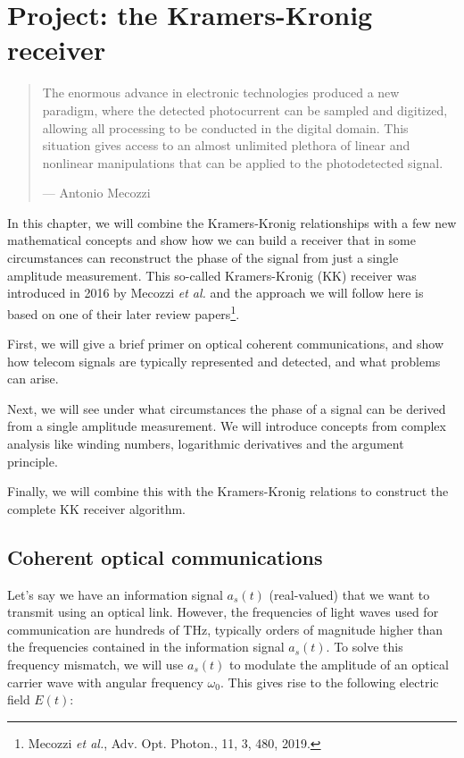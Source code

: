 \chapter{Project: the Kramers-Kronig receiver}
\label{h:kk-receiver}

\begin{quote}
The enormous advance in electronic technologies produced a new paradigm, where the detected photocurrent can be sampled and digitized, allowing all processing to be conducted in the digital domain. This situation gives access to an almost unlimited plethora of linear and nonlinear manipulations that can be applied to the photodetected signal.

--- Antonio Mecozzi
\end{quote}


\chaptertoc

In this chapter, we will combine the Kramers-Kronig relationships with a few new mathematical concepts and show how we can build a receiver that in some circumstances can reconstruct the phase of the signal from just a single amplitude measurement. This so-called Kramers-Kronig (KK) receiver was introduced in 2016 by Mecozzi \emph{et al.} and the approach we will follow here is based on one of their later review papers\footnote{Mecozzi \emph{et al.}, Adv. Opt. Photon., 11, 3, 480, 2019.}.

First, we will give a brief primer on optical coherent communications, and show how telecom signals are typically represented and detected, and what problems can arise.

Next, we will see under what circumstances the phase of a signal can be derived from a single amplitude measurement. We will introduce concepts from complex analysis like winding numbers, logarithmic derivatives and the argument principle.

Finally, we will combine this with the Kramers-Kronig relations to construct the complete KK receiver algorithm.

\pagebreak

\section{Coherent optical communications}

Let's say we have an information signal $a_s(t)$ (real-valued) that we want to transmit using an optical link. However, the frequencies of light waves used for communication are hundreds of THz, typically orders of magnitude higher than the frequencies contained in the information signal $a_s(t)$. To solve this frequency mismatch, we will use $a_s(t)$ to modulate the amplitude of an optical carrier wave with angular frequency $\omega_0$. This gives rise to the following electric field $E(t)$:

